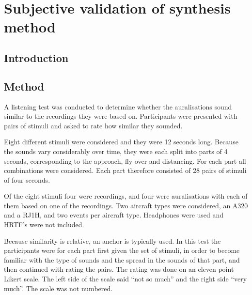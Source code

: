 \chapter{Subjective validation of synthesis method}\label{chapter:test}

\section{Introduction}


\section{Method}

A listening test was conducted to determine whether the auralisations sound
similar to the recordings they were based on. Participants were presented with
pairs of stimuli and asked to rate how similar they sounded.


Eight different stimuli were considered and they were 12 seconds long.
Because the sounds vary considerably over time, they were each split into parts
of 4 seconds, corresponding to the approach, fly-over and distancing. For each
part all combinations were considered. Each part therefore consisted of 28 pairs
of stimuli of four seconds.

Of the eight stimuli four were recordings, and four were auralisations with each
of them based on one of the recordings. Two aircraft types were considered, an
A320 and a RJ1H, and two events per aircraft type.
Headphones were used and HRTF's were not included.

Because similarity is relative, an anchor is typically used. In this test the
participants were for each part first given the set of stimuli, in order to
become familiar with the type of sounds and the spread in the sounds of that
part, and then continued with rating the pairs. The rating was done on an eleven
point Likert scale. The left side of the scale said ``not so much'' and the right
side ``very much''. The scale was not numbered.


